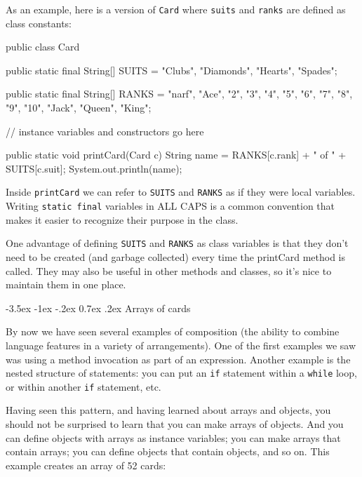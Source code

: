 \documentclass[12pt]{book}
\makeatletter
\theoremstyle{exercise}
\newcommand{\java}[1]{\verb"#1"}
\renewcommand{\section}{\@startsection{section}{1}{\z@}%
    {-3.5ex \@plus -1ex \@minus -.2ex}%
    {0.7ex \@plus.2ex}%
    {\normalfont\Large\bfseries}}
\newcommand{\java}[1]{\lstinline{#1}} %
\makeatother
\begin{document}
As an example, here is a version of \java{Card} where \java{suits} and \java{ranks} are defined as class constants:

\begin{code}
public class Card {

    public static final String[] SUITS = {
        "Clubs", "Diamonds", "Hearts", "Spades"};

    public static final String[] RANKS = {
        "narf", "Ace", "2", "3", "4", "5", "6", "7", "8", "9",
        "10", "Jack", "Queen", "King"};

    // instance variables and constructors go here

    public static void printCard(Card c) {
        String name = RANKS[c.rank] + " of " + SUITS[c.suit];
        System.out.println(name);
    }
}
\end{code}

Inside \java{printCard} we can refer to \java{SUITS} and \java{RANKS} as if they were local variables.
Writing \java{static final} variables in ALL CAPS is a common convention that makes it easier to recognize their purpose in the class.

One advantage of defining \java{SUITS} and \java{RANKS} as class variables is that they don't need to be created (and garbage collected) every time the printCard method is called.
They may also be useful in other methods and classes, so it's nice to maintain them in one place.


\section{Arrays of cards}
\label{cardarray}



By now we have seen several examples of composition (the ability to combine language features in a variety of arrangements).
One of the first examples we saw was using a method invocation as part of an expression.
Another example is the nested structure of statements: you can put an \java{if} statement within a \java{while} loop, or within another \java{if} statement, etc.

Having seen this pattern, and having learned about arrays and objects, you should not be surprised to learn that you can make arrays of objects.
And you can define objects with arrays as instance variables; you can make arrays that contain arrays; you can define objects that contain objects, and so on.
This example creates an array of 52 cards:
\end{document}
